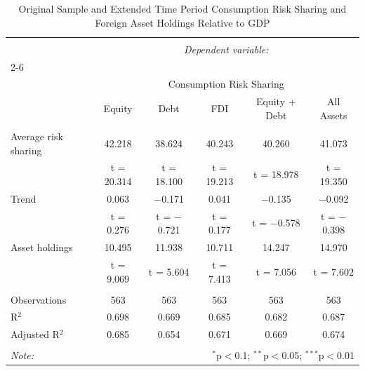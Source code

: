 
\begin{table}[!htbp] \centering 
  \caption{Original Sample and Extended Time Period Consumption Risk Sharing and Foreign Asset Holdings Relative to GDP} 
  \label{} 
\begin{tabular}{@{\extracolsep{5pt}}lccccc} 
\\[-1.8ex]\hline 
\hline \\[-1.8ex] 
 & \multicolumn{5}{c}{\textit{Dependent variable:}} \\ 
\cline{2-6} 
\\[-1.8ex] & \multicolumn{5}{c}{Consumption Risk Sharing} \\ 
 & Equity & Debt & FDI & Equity + Debt & All Assets \\ 
\hline \\[-1.8ex] 
 Average risk sharing & 42.218 & 38.624 & 40.243 & 40.260 & 41.073 \\ 
  & t = 20.314 & t = 18.100 & t = 19.213 & t = 18.978 & t = 19.350 \\ 
  Trend & 0.063 & $-$0.171 & 0.041 & $-$0.135 & $-$0.092 \\ 
  & t = 0.276 & t = $-$0.721 & t = 0.177 & t = $-$0.578 & t = $-$0.398 \\ 
  Asset holdings & 10.495 & 11.938 & 10.711 & 14.247 & 14.970 \\ 
  & t = 9.069 & t = 5.604 & t = 7.413 & t = 7.056 & t = 7.602 \\ 
 \hline \\[-1.8ex] 
Observations & 563 & 563 & 563 & 563 & 563 \\ 
R$^{2}$ & 0.698 & 0.669 & 0.685 & 0.682 & 0.687 \\ 
Adjusted R$^{2}$ & 0.685 & 0.654 & 0.671 & 0.669 & 0.674 \\ 
\hline 
\hline \\[-1.8ex] 
\textit{Note:}  & \multicolumn{5}{r}{$^{*}$p$<$0.1; $^{**}$p$<$0.05; $^{***}$p$<$0.01} \\ 
\end{tabular} 
\end{table} 
